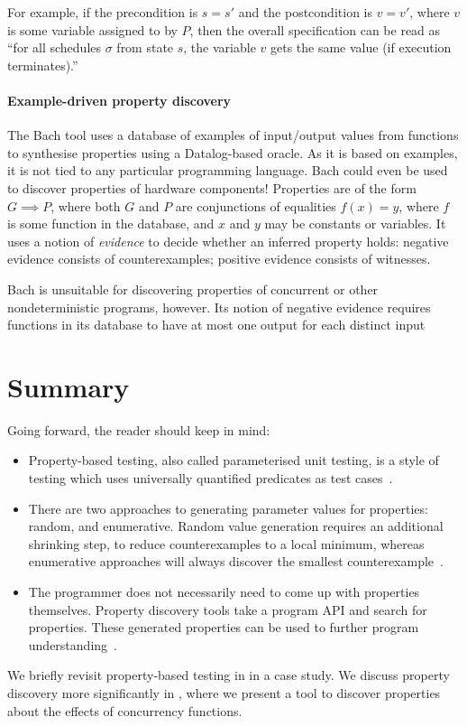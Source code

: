 \noindent
For example, if the precondition is $s = s'$ and the postcondition is
$v = v'$, where $v$ is some variable assigned to by $P$, then the
overall specification can be read as ``for all schedules $\sigma$ from
state $s$, the variable $v$ gets the same value (if execution
terminates).''

\paragraph{Example-driven property discovery}
The Bach \parencite{smith2017} tool uses a database of examples of
input/output values from functions to synthesise properties using a
Datalog-based oracle.  As it is based on examples, it is not tied to
any particular programming language.  Bach could even be used to
discover properties of hardware components!  Properties are of the
form $G \implies P$, where both $G$ and $P$ are conjunctions of
equalities $f(x) = y$, where $f$ is some function in the database, and
$x$ and $y$ may be constants or variables.  It uses a notion of
\emph{evidence} to decide whether an inferred property holds: negative
evidence consists of counterexamples; positive evidence consists of
witnesses.

Bach is unsuitable for discovering properties of concurrent or other
nondeterministic programs, however.  Its notion of negative evidence
requires functions in its database to have at most one output for each
distinct input

\section{Summary}

Going forward, the reader should keep in mind:

\begin{itemize}
\item Property-based testing, also called parameterised unit testing,
  is a style of testing which uses universally quantified predicates
  as test cases~.

\item There are two approaches to generating parameter values for
  properties: random, and enumerative.  Random value generation
  requires an additional shrinking step, to reduce counterexamples to
  a local minimum, whereas enumerative approaches will always discover
  the smallest counterexample~.

\item The programmer does not necessarily need to come up with
  properties themselves.  Property discovery tools take a program API
  and search for properties.  These generated properties can be used
  to further program understanding~.
\end{itemize}

We briefly revisit property-based testing in  in a
case study.  We discuss property discovery more significantly in
, where we present a tool to discover properties about
the effects of concurrency functions.
